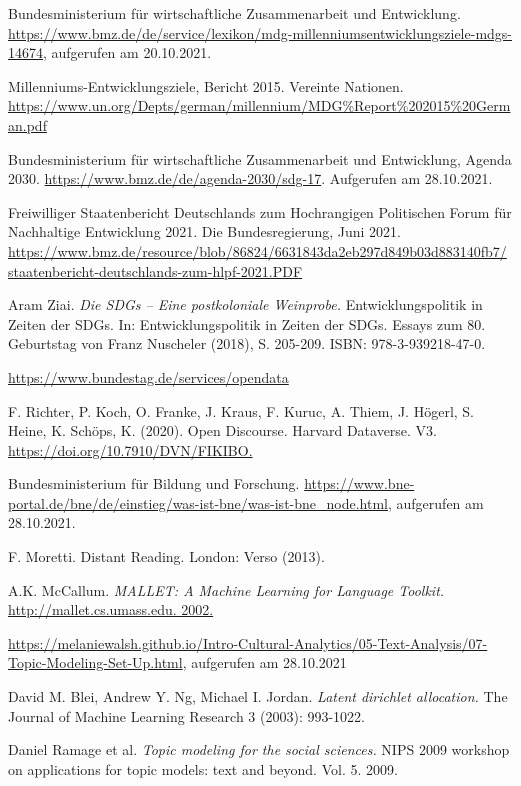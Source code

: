 \documentclass[a4paper,11pt]{article}
\begin{document}
\raggedright
\begin{thebibliography}{xxx}
 Bundesministerium für wirtschaftliche Zusammenarbeit und
  Entwicklung. 
  \url{https://www.bmz.de/de/service/lexikon/mdg-millenniumsentwicklungsziele-mdgs-14674}, aufgerufen am 20.10.2021.
        
 Millenniums-Entwicklungsziele, Bericht 2015. Vereinte Nationen. 
  \url{https://www.un.org/Depts/german/millennium/MDG\%Report\%202015\%20German.pdf}
        
 Bundesministerium für wirtschaftliche Zusammenarbeit und
  Entwicklung, Agenda 2030.
  \url{https://www.bmz.de/de/agenda-2030/sdg-17}. Aufgerufen am 28.10.2021.
        
 Freiwilliger Staatenbericht Deutschlands zum Hochrangigen
  Politischen Forum für Nachhaltige Entwicklung 2021. Die Bundesregierung,
  Juni 2021.
  \url{https://www.bmz.de/resource/blob/86824/6631843da2eb297d849b03d883140fb7/staatenbericht-deutschlands-zum-hlpf-2021.PDF}
        
 Aram Ziai. \emph{Die SDGs – Eine postkoloniale Weinprobe.}
  Entwicklungspolitik in Zeiten der SDGs. In: Entwicklungspolitik in Zeiten
  der SDGs. Essays zum 80. Geburtstag von Franz Nuscheler (2018), S. 205-209.
  ISBN: 978-3-939218-47-0.
    
 \url{https://www.bundestag.de/services/opendata}
        
 F. Richter, P. Koch, O. Franke, J. Kraus, F. Kuruc,
  A. Thiem, J. Högerl, S. Heine, K. Schöps, K. (2020). Open Discourse.
  Harvard Dataverse. V3.  \url{https://doi.org/10.7910/DVN/FIKIBO.}
        
 Bundesministerium für Bildung und Forschung.
  \url{https://www.bne-portal.de/bne/de/einstieg/was-ist-bne/was-ist-bne_node.html},
  aufgerufen am 28.10.2021.
        
 F. Moretti. Distant Reading. London: Verso (2013).
    
 A.K. McCallum.  \emph{MALLET: A Machine Learning for Language
  Toolkit.}  \url{http://mallet.cs.umass.edu. 2002.}
    
  \url{https://melaniewalsh.github.io/Intro-Cultural-Analytics/05-Text-Analysis/07-Topic-Modeling-Set-Up.html},
  aufgerufen am 28.10.2021
        
 David M. Blei, Andrew Y. Ng, Michael I. Jordan. \emph{Latent
  dirichlet allocation.} The Journal of Machine Learning Research 3 (2003):
  993-1022.
    
 Daniel Ramage et al.  \emph{Topic modeling for the social
  sciences.} NIPS 2009 workshop on applications for topic models: text and
  beyond. Vol. 5. 2009.
\end{thebibliography}
\end{document}
